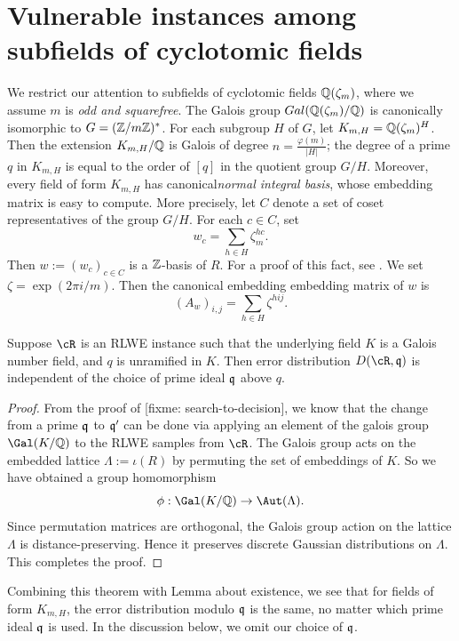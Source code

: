 \documentclass{amsart}
\begin{document}
\section{Vulnerable instances among subfields of cyclotomic fields}\label{sec: sub-cyclotomics}

We restrict our attention to subfields of cyclotomic fields $\mathbb{Q}(\zeta_m)$, where we assume $m$ is {\it odd and squarefree}. The Galois group $Gal(\mathbb{Q}(\zeta_m)/\mathbb{Q})$ is canonically isomorphic to $G = (\mathbb{Z}/m\mathbb{Z})^*$. For each subgroup $H$ of $G$, let $K_{m,H} = \mathbb{Q}(\zeta_m)^H$.
Then the extension $K_{m,H}/\mathbb{Q}$ is Galois of degree $n = \frac{\varphi(m)}{|H|}$; the degree of a prime $q$ in $K_{m,H}$ is equal to the order of $[q]$ in the quotient group $G/H$. Moreover, every field of form $K_{m,H}$ has canonical{\it normal integral basis}, whose embedding matrix is easy to compute. More precisely, let $C$ denote a set of coset representatives of the group $G/H$. For each $c \in C$, set
\[
    w_c =  \sum_{h \in H} \zeta_m^{hc}.
\]
Then  $w := (w_c)_{c \in C}$ is a $\mathbb{Z}$-basis of $R$. For a proof of this fact, see \cite[Proposition 6.1]{johnston2011notes}. We set $\zeta = \exp(2\pi i /m)$. Then the canonical embedding embedding matrix of $w$ is
\[
    (A_w)_{i,j} = \sum_{h \in H}{\zeta^{hij}}.
\]

\begin{Lemma} \label{lem: symmetry}
Suppose $\cR$ is an RLWE instance such that the underlying field $K$ is a Galois number field, and $q$ is unramified in $K$. Then error distribution $D(\cR, \fq)$ is independent of the choice of prime ideal $\mathfrak{q}$ above $q$.
\end{Lemma}

\begin{proof}
From the proof of [fixme: search-to-decision], we know that the change from a prime $\mathfrak{q}$ to $\mathfrak{q}'$ can be done via applying an element of the galois group $\Gal(K/\bQ)$ to the RLWE samples from $\cR$. The Galois group acts on the embedded lattice $\Lambda := \iota(R)$ by permuting the set of embeddings of $K$. So we have obtained a group homomorphism $$\phi: \Gal(K/\bQ) \to \Aut(\Lambda).$$
Since permutation matrices are orthogonal, the Galois group action on the lattice $\Lambda$ is distance-preserving. Hence it preserves discrete Gaussian distributions on $\Lambda$. This completes the proof.
\end{proof}

Combining this theorem with Lemma about existence, we see that for fields of form $K_{m,H}$, the error distribution modulo $\mathfrak{q}$ is the same, no matter which prime ideal $\mathfrak{q}$ is used. In the discussion below, we omit our choice of $\mathfrak{q}$.
\end{document}

